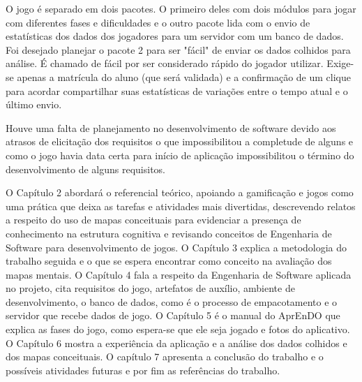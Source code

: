 O jogo é separado em dois pacotes. O primeiro deles com dois módulos para jogar com diferentes fases e dificuldades e o outro pacote lida com o envio de estatísticas dos dados dos jogadores para um servidor com um banco de dados. Foi desejado planejar o pacote 2 para ser "fácil" de enviar os dados colhidos para análise. É chamado de fácil por ser considerado rápido do jogador utilizar. Exige-se apenas a matrícula do aluno (que será validada) e a confirmação de um clique para acordar compartilhar suas estatísticas de variações entre o tempo atual e o último envio.

Houve uma falta de planejamento no desenvolvimento de software devido aos atrasos de elicitação dos requisitos o que impossibilitou a completude de alguns e como o jogo havia data certa para início de aplicação impossibilitou o término do desenvolvimento de alguns requisitos. 

O Capítulo 2 abordará o referencial teórico, apoiando a gamificação e jogos como uma prática que deixa as tarefas e atividades mais divertidas, descrevendo relatos a respeito do uso de mapas conceituais para evidenciar a presença de conhecimento na estrutura cognitiva e revisando conceitos de Engenharia de Software para desenvolvimento de jogos.
O Capítulo 3 explica a metodologia do trabalho seguida e o que se espera encontrar como conceito na avaliação dos mapas mentais. O Capítulo 4 fala a respeito da Engenharia de Software aplicada no projeto, cita requisitos do jogo, artefatos de auxílio, ambiente de desenvolvimento, o banco de dados, como é o processo de empacotamento e o servidor que recebe dados de jogo. O Capítulo 5 é o manual do AprEnDO que explica as fases do jogo, como espera-se que ele seja jogado e fotos do aplicativo. O Capítulo 6 mostra a experiência da aplicação e a análise dos dados colhidos e dos mapas conceituais. O capítulo 7 apresenta a conclusão do trabalho e o possíveis atividades futuras e por fim as referências do trabalho.
